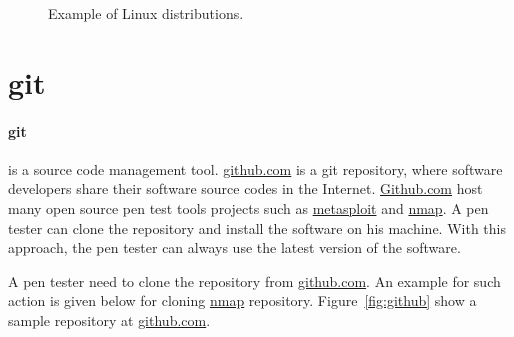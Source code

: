 \documentclass[7x9]{times}
\begin{document}

\begin{figure}[!t]
\centering
{}
\hfil
{}
\caption{Example of Linux distributions.}
\label{fig:linux}
\end{figure}




\section{git}

\paragraph{git}\cite{loeliger2012} is a source code
management tool. \url{github.com} is a git repository, where
software developers share their software source codes in the
Internet. \url{Github.com} host many open source pen test
tools projects such as \url{metasploit} and \url{nmap}. A
pen tester can clone the repository and install the software
on his machine. With this approach, the pen tester can
always use the latest version of the software.

A pen tester need to clone the repository from \url{github.com}. An
example for such action is given below for cloning \url{nmap}
repository. Figure~\ref{fig:github} show a sample repository at
\url{github.com}.
\end{document}

